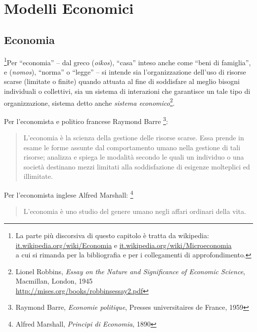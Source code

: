 


\chapter{Modelli Economici}

\section{Economia}
\label{sec:modelli_economia}

\footnote{
La parte più discorsiva di questo capitolo è tratta da wikipedia:\\
\url{it.wikipedia.org/wiki/Economia} \quad e \quad
\url{it.wikipedia.org/wiki/Microeconomia}\\
a cui si rimanda per la bibliografia e per i collegamenti di approfondimento.
}Per ``economia'' – dal greco %
(\emph{oikos}), ``casa'' inteso anche come ``beni di famiglia'', e %
(\emph{nomos}), ``norma'' o ``legge'' – si intende sia l'organizzazione 
dell'uso di risorse scarse (limitate o finite) quando attuata al 
fine di soddisfare al meglio bisogni individuali o collettivi, sia 
un sistema di interazioni che garantisce un tale tipo di organizzazione, 
sistema detto anche \emph{sistema economico}\footnote{
Lionel Robbins, \emph{Essay on the Nature and Significance of Economic 
Science}, Macmillan, London, 1945 \\
\url{http://mises.org/books/robbinsessay2.pdf}}.

Per l'economista e politico francese Raymond Barre
\footnote{Raymond Barre, \emph{Economie politique}, Presses universitaires de 
France, 1959}: 
\begin{quote}
L'economia 
è la scienza della gestione delle risorse scarse. Essa prende in esame le 
forme assunte dal comportamento umano nella gestione di tali risorse; 
analizza e spiega le modalità secondo le quali un individuo o una società 
destinano mezzi limitati alla soddisfazione di esigenze molteplici ed 
illimitate.
\end{quote}

Per l'economista inglese Alfred Marshall:
\footnote{Alfred Marshall, \emph{Principi di Economia}, 1890}
\begin{quotation}
 L'economia è uno studio del genere umano negli affari ordinari della vita. 
\end{quotation}

